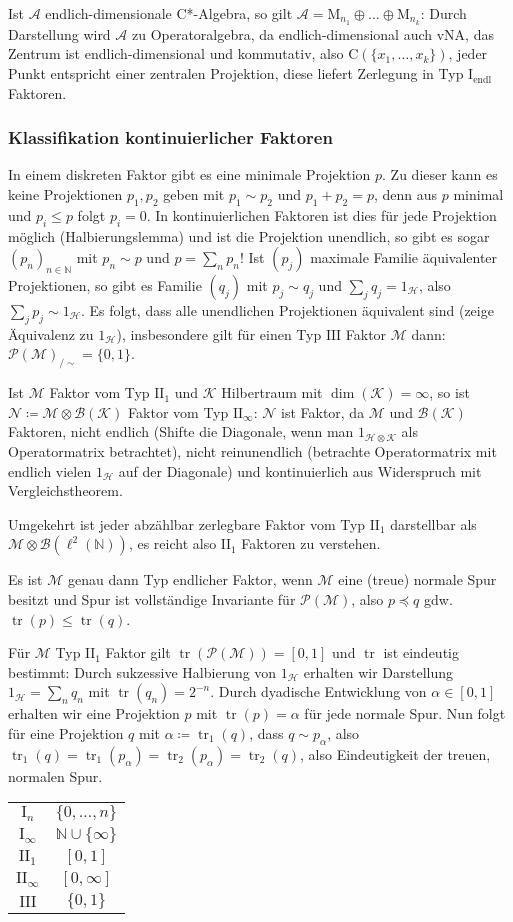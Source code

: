 \documentclass[11pt,a4paper]{scrartcl}
\newcommand{\N}{\mathbb{N}} %
\newcommand{\Hc}{\mathcal{H}}
\newcommand{\Kc}{\mathcal{K}}
\newcommand{\A}{\mathcal{A}}
\newcommand{\B}{\mathcal{B}}
\newcommand{\M}{\mathcal{M}}
\newcommand{\Nc}{\mathcal{N}}
\newcommand{\Ifin}{\mathrm{I}_\mathrm{endl}}
\newcommand{\IIfin}{\mathrm{II}_1}
\newcommand{\IIinf}{\mathrm{II}_\infty}
\newcommand{\III}{\mathrm{III}}
\theoremstyle{plain}
\theoremstyle{definition}
\theoremstyle{remark}
\DeclareMathOperator{\tr}{tr}
\begin{document}
Ist $\A$ endlich-dimensionale C*-Algebra, so gilt $\A=\mathrm{M}_{n_1}\oplus \dots\oplus \mathrm{M}_{n_k}$: Durch Darstellung wird $\A$ zu Operatoralgebra, da endlich-dimensional auch vNA, das Zentrum ist endlich-dimensional und kommutativ, also $\mathrm{C}(\{x_1,\dots,x_k\})$, jeder Punkt entspricht einer zentralen Projektion, diese liefert Zerlegung in Typ $\Ifin$ Faktoren.

\subsubsection{Klassifikation kontinuierlicher Faktoren}

In einem diskreten Faktor gibt es eine minimale Projektion $p$. Zu dieser kann es keine Projektionen $p_1,p_2$ geben mit $p_1\sim p_2$ und $p_1+p_2=p$, denn aus $p$ minimal und $p_i\leq p$ folgt $p_i=0$. In kontinuierlichen Faktoren ist dies für jede Projektion möglich (Halbierungslemma) und ist die Projektion unendlich, so gibt es sogar $(p_n)_{n\in \N}$ mit $p_n\sim p$ und $p=\sum_n p_n$! Ist $(p_j)$ maximale Familie äquivalenter Projektionen, so gibt es Familie $(q_j)$ mit $p_j\sim q_j$ und $\sum_j q_j=1_\Hc$, also $\sum_j p_j \sim 1_\Hc$. Es folgt, dass alle unendlichen Projektionen äquivalent sind (zeige Äquivalenz zu $1_\Hc$), insbesondere gilt für einen Typ $\III$ Faktor $\M$ dann: $\mathcal{P}(\M)_{/\sim}=\{0,1\}$.

Ist $\M$ Faktor vom Typ $\IIfin$ und $\Kc$ Hilbertraum mit $\dim(\Kc)=\infty$, so ist $\Nc\coloneqq \M \otimes \B(\Kc)$ Faktor vom Typ $\IIinf$: $\Nc$ ist Faktor, da $\M$ und $\B(\Kc)$ Faktoren, nicht endlich (Shifte die Diagonale, wenn man $1_{\Hc\otimes \Kc}$ als Operatormatrix betrachtet), nicht reinunendlich (betrachte Operatormatrix mit endlich vielen $1_\Hc$ auf der Diagonale) und kontinuierlich aus Widerspruch mit Vergleichstheorem.

Umgekehrt ist jeder abzählbar zerlegbare Faktor vom Typ $\IIfin$ darstellbar als $\M\otimes \B(\ell^2(\N))$, es reicht also $\IIfin$ Faktoren zu verstehen.

Es ist $\M$ genau dann Typ endlicher Faktor, wenn $\M$ eine (treue) normale Spur besitzt und Spur ist vollständige Invariante für $\mathcal{P}(\M)$, also $p\preccurlyeq q$ gdw.\ $\tr(p)\leq \tr(q)$.

Für $\M$ Typ $\IIfin$ Faktor gilt $\tr(\mathcal{P}(\M))=[0,1]$ und $\tr$ ist eindeutig bestimmt: Durch sukzessive Halbierung von $1_\Hc$ erhalten wir Darstellung $1_\Hc=\sum_n q_n$ mit $\tr(q_n)=2^{-n}$. Durch dyadische Entwicklung von $\alpha\in [0,1]$ erhalten wir eine Projektion $p$ mit $\tr(p)=\alpha$ für jede normale Spur. Nun folgt für eine Projektion $q$ mit $\alpha\coloneqq \tr_1(q)$, dass $q\sim p_\alpha$, also $\tr_1(q)=\tr_1(p_\alpha)=\tr_2(p_\alpha)=\tr_2(q)$, also Eindeutigkeit der treuen, normalen Spur.

\begin{table}[h]
    \centering
    \begin{tabular}{cc}
        $\mathrm{I}_n$ & $\{0,\dots,n\}$ \\
        $\mathrm{I}_\infty$ & $\N \cup \{\infty\}$ \\
        $\IIfin$ & $[0,1]$ \\
        $\IIinf$ & $[0,\infty]$ \\
        $\III$ & $\{0,1\}$
    \end{tabular}
\end{table}
\end{document}
